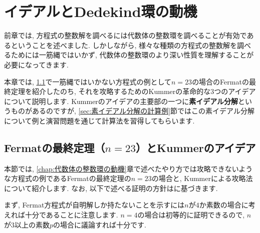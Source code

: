 \documentclass[11pt,b5paper,oneside,titlepage,lualatex]{ltjsreport}
\begin{document}
\clearpage


\chapter{イデアルとDedekind環の動機} \label{chap:イデアルとDedekind環の動機}


前章では, 方程式の整数解を調べるには代数体の整数環を調べることが有効であるということを述べました. 
しかしながら, 様々な種類の方程式の整数解を調べるためには一筋縄ではいかず, 代数体の整数環のより深い性質を理解することが必要になってきます. 

本章では, \ref{sec:Fermatの最終定理（n=23）}で一筋縄ではいかない方程式の例として$ n=23 $の場合のFermatの最終定理を紹介したのち, それを攻略するためのKummerの革命的な3つのアイデアについて説明します. 
Kummerのアイデアの主要部の一つに\textbf{素イデアル分解}というものがあるのですが, \ref{sec:素イデアル分解の計算例}節ではこの素イデアル分解について例と演習問題を通じて計算法を習得してもらいます. 


\section{Fermatの最終定理（$ n=23 $）とKummerのアイデア} \label{sec:Fermatの最終定理（n=23）}


本節では, \ref{chap:代数体の整数環の動機}章で述べたやり方では攻略できないような方程式の例であるFermatの最終定理の$ n=23 $の場合と, Kummerによる攻略法について紹介します. 
なお, 以下で述べる証明の方針は\cite[定理 8.11.15]{Yukie1}に基づきます. 

まず, Fermat方程式が自明解しか持たないことを示すには$ n $が$ 4 $か素数の場合に考えれば十分であることに注意します. 
$ n=4 $の場合は初等的に証明できるので, $ n $が$ 3 $以上の素数$ p $の場合に議論すれば十分です. 
\end{document}
